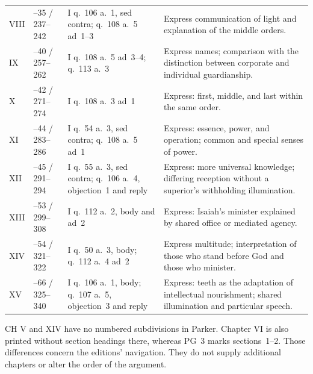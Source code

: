 \begin{longtable}{@{}>{\raggedright\arraybackslash}p{.06\linewidth}>{\raggedright\arraybackslash}p{.17\linewidth}>{\raggedright\arraybackslash}p{.32\linewidth}>{\raggedright\arraybackslash}p{.38\linewidth}@{}}
VIII & 31--35 / 237--242 & I q.~106 a.~1, sed contra; q.~108 a.~5 ad~1--3 & Express communication of light and explanation of the middle orders. \\
IX & 35--40 / 257--262 & I q.~108 a.~5 ad~3--4; q.~113 a.~3 & Express names; comparison with the distinction between corporate and individual guardianship. \\
X & 41--42 / 271--274 & I q.~108 a.~3 ad~1 & Express: first, middle, and last within the same order. \\
XI & 42--44 / 283--286 & I q.~54 a.~3, sed contra; q.~108 a.~5 ad~1 & Express: essence, power, and operation; common and special senses of power. \\
XII & 44--45 / 291--294 & I q.~55 a.~3, sed contra; q.~106 a.~4, objection~1 and reply & Express: more universal knowledge; differing reception without a superior's withholding illumination. \\
XIII & 46--53 / 299--308 & I q.~112 a.~2, body and ad~2 & Express: Isaiah's minister explained by shared office or mediated agency. \\
XIV & 53--54 / 321--322 & I q.~50 a.~3, body; q.~112 a.~4 ad~2 & Express multitude; interpretation of those who stand before God and those who minister. \\
XV & 54--66 / 325--340 & I q.~106 a.~1, body; q.~107 a.~5, objection~3 and reply & Express: teeth as the adaptation of intellectual nourishment; shared illumination and particular speech. \\
\bottomrule
\end{longtable}
\endgroup

CH V and XIV have no numbered subdivisions in Parker. Chapter VI is also printed without section headings there, whereas PG~3 marks sections~1--2. Those differences concern the editions' navigation. They do not supply additional chapters or alter the order of the argument.
